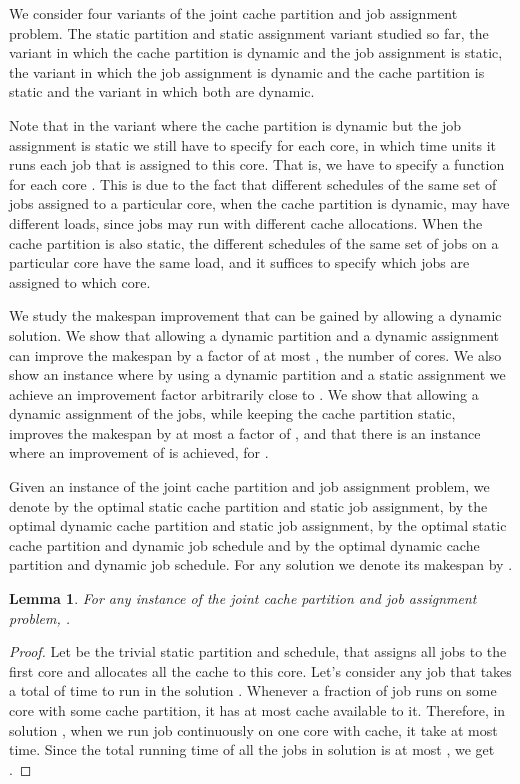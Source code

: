 \documentclass[11pt]{article}
\newtheorem{lemma}[theorem]{Lemma}
\begin{document}
We consider four variants of the joint cache partition and job assignment problem.
The static partition and static assignment variant studied so far, the variant in which the cache partition is dynamic and the job assignment is static, the variant in which the job assignment is dynamic and the cache partition is static and the variant in which both are dynamic.

Note that in the variant where the cache partition is dynamic but the job assignment is static we still have to specify for each core, in which time units it runs each job that is assigned to this core. That is, we have to specify a function  for each core . This is due to the fact that different schedules of the same set of jobs assigned to a particular core, when the cache partition is dynamic, may have  different loads, since jobs may run with different cache allocations. When the cache partition is also static, the different schedules of the same set of jobs on a particular core have the same load, and it suffices to specify which jobs are assigned to which core.

We study the makespan improvement that can be gained by allowing a dynamic solution.
We show that allowing a dynamic partition and a dynamic assignment can improve the makespan by a factor of at most , the number of cores.
We also show an instance where by using a dynamic partition and a static assignment we achieve an improvement factor arbitrarily close to .
We show that allowing a dynamic assignment of the jobs, while keeping the cache partition static, improves the makespan by at most a factor of , and that there is an instance where an  improvement of  is achieved, for .

Given an instance of the joint cache partition and job assignment problem, we denote by  the optimal static cache partition and static job assignment, by  the optimal dynamic cache partition and static job assignment, by  the optimal static cache partition and dynamic job schedule and by  the optimal dynamic cache partition and dynamic job schedule. For any solution  we denote its makespan by .


\begin{lemma}\label{dsub}
For any instance of the joint cache partition and job assignment problem,
.
\end{lemma}
\begin{proof}
Let  be the trivial static partition and schedule, that assigns all jobs to the first core and allocates all the cache to this core.
Let's consider any job  that takes a total of  time to run in the solution .
Whenever a fraction of job  runs on some core with some cache partition, it has at most  cache available to it.
Therefore, in solution , when we run job  continuously on one core with  cache,  it take at most  time.
Since the total running time of all the jobs in solution  is at most , we get .
\end{proof}
\end{document}

